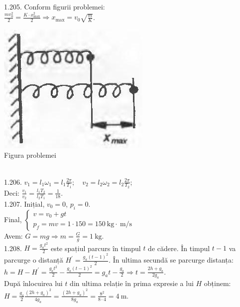 1.205. Conform figurii problemei:\\ $\frac{m v_{0}^{2}}{2}=\frac{K \cdot x_{\max }^{2}}{2} \Rightarrow x_{\max }=v_{0} \sqrt{\frac{m}{K}}$.\\ \begin{center} \includegraphics[width=0.4\linewidth]{images/2025_07_01_5b3ff9fa0d508c8e9f17g-242(1)}\\ Figura problemei \end{center}\\  

1.206. $v_{1}=l_{1} \omega_{1}=l_{1} \frac{2 \pi}{T_{1}}; \quad v_{2}=l_{2} \omega_{2}=l_{2} \frac{2 \pi}{T_{2}}$;\\ Deci: $\frac{v_{1}}{v_{2}}=\frac{l_{1} T_{2}}{l_{2} T_{1}}=\frac{1}{18}$.\\

1.207. Inițial, $v_{0}=0$, $p_{i}=0$.\\ Final, $\left\{\begin{array}{l}v=v_{0}+g t\\ p_{f}=m v=1 \cdot 150=150 \mathrm{~kg} \cdot \mathrm{~m} / \mathrm{s}\end{array}\right.$\\ Avem: $G=m g \Rightarrow m=\frac{G}{g}=1 \mathrm{~kg}$.\\

1.208. $H=\frac{g_{a} t^{2}}{2}$ este spațiul parcurs în timpul $t$ de cădere. În timpul $t-1$ va parcurge o distanță $H^{\prime}=\frac{g_{a}(t-1)^{2}}{2}$. În ultima secundă se parcurge distanța:\\ $h=H-H^{\prime}=\frac{g_{a} t^{2}}{2}-\frac{g_{a}(t-1)^{2}}{2}=g_{a} t-\frac{g_{a}}{2} \Rightarrow t=\frac{2 h+g_{a}}{2 g_{a}}$.\\ După înlocuirea lui $t$ din ultima relație în prima expresie a lui $H$ obținem:\\ $H=\frac{g_{a}}{2} \frac{\left(2 h+g_{a}\right)^{2}}{4 g_{a}}=\frac{\left(2 h+g_{a}\right)^{2}}{8 g_{a}}=\frac{8^{2}}{8 \cdot 4}=4 \mathrm{~m}$.\\

